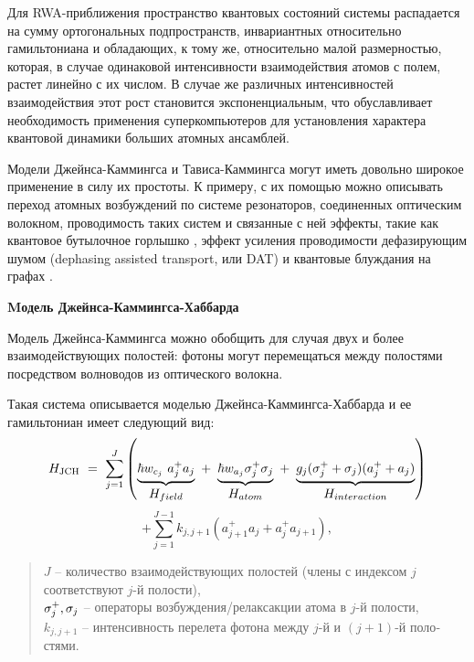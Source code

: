 Для RWA-приближения \cite{ozhigov_qq,rwa_rabi_1,rwa_rabi_2} пространство квантовых состояний системы распадается на сумму ортогональных подпространств, инвариантных относительно гамильтониана и обладающих, к тому же, относительно малой размерностью, которая, в случае одинаковой интенсивности взаимодействия атомов с полем, растет линейно с их числом. В случае же различных интенсивностей взаимодействия этот рост становится экспоненциальным, что обуславливает необходимость применения суперкомпьютеров для установления характера квантовой динамики больших атомных ансамблей.

Модели Джейнса-Каммингса и Тависа-Каммингса могут иметь довольно широкое применение в силу их простоты. К примеру, с их помощью можно описывать переход атомных возбуждений по системе резонаторов, соединенных оптическим волокном, проводимость таких систем \cite{skovoroda_conductivity_1,skovoroda_conductivity_2} и связанные с ней эффекты, такие как квантовое бутылочное горлышко \cite{quantum_bottleneck_victorova}, эффект усиления проводимости дефазирующим шумом (dephasing assisted transport, или DAT) \cite{dat_plenio,dat_quantum_dots} и квантовые блуждания на графах \cite{quantum_walks_ambainis,quantum_walks_ambainis_applications,quantum_walks_mixing,quantum_walks_ambainis_speedup}.

\clearpage
\indent\textbf{Mодель Джейнса-Каммингса-Хаббарда}

Модель Джейнса-Каммингса можно обобщить для случая двух и более взаимодействующих полостей: фотоны могут перемещаться между полостями посредством волноводов из оптического волокна.
\begin{figure}[h!]
	\noindent{}
\end{figure}

Такая система описывается моделью Джейнса-Каммингса-Хаббарда \cite{jch_time_evolution,jch_site_dependent_control,jch_quench_dynamics} и ее гамильтониан имеет следующий вид:
\[
H_{\text{JCH}}~=~\sum_{j=1}^J \left(\underbrace{\hbar w_{c_{j}}\ a_j^+a_{j}}_{\textstyle H_{field}}~+~\underbrace{\hbar w_{a_{j}}{\sigma_{j}^+\sigma_{j}}}_{\textstyle H_{atom}}~+~\underbrace{g_j{(\sigma_{j}^{+}+\sigma_{j})(a_{j}^{+}+a_{j})}}_{\textstyle H_{interaction}} \right)
\]
\begin{equation}
	+\sum_{j=1}^{J-1}{k_{j,j+1}\left(a_{j+1}^+a_j+a_{j}^+a_{j+1}\right)},
\end{equation}
\begin{quote}
	$J$ -- количество взаимодействующих полостей (члены с индексом $j$ соответствуют $j$-й полости),\\
	$\sigma_{j}^{+},\sigma_{j}$ -- операторы возбуждения/релаксакции атома в $j$-й полости,\\
	$k_{j,j+1}$ -- интенсивность перелета фотона между $j$-й и $(j+1)$-й поло­стями.
\end{quote}

